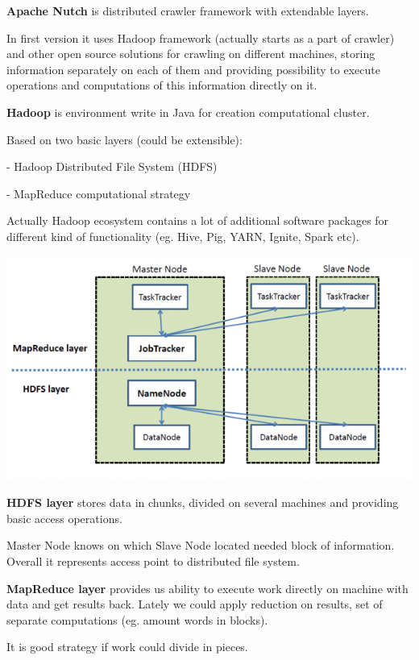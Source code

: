 \documentclass[9pt]{extarticle}
\begin{document}
\begin{multicols}{2}
\textbf{Apache Nutch} is distributed crawler framework with extendable layers.

In first version it uses Hadoop framework (actually starts as a part of crawler)
and other open source solutions for crawling on different machines, storing
information separately on each of them and providing possibility to execute
operations and computations of this information directly on it.\\

\columnbreak

\textbf{Hadoop} is environment write in Java for creation computational cluster.

Based on two basic layers (could be extensible):

- Hadoop Distributed File System (HDFS)

- MapReduce computational strategy

Actually Hadoop ecosystem contains a lot of additional software packages for
different kind of functionality (eg. Hive, Pig, YARN, Ignite, Spark etc).  



\end{multicols}

\begin{center}
\includegraphics[width=0.6\linewidth]{hadoop}
\end{center}

\begin{multicols}{2}

\textbf{HDFS layer}
stores data in chunks, divided on several machines and providing basic access
operations. 

Master Node knows on which Slave Node located needed block of information.
Overall it represents access point to distributed file system. 

\columnbreak

\textbf{MapReduce layer}
provides us ability to execute work directly on machine with data and get
results back. Lately we could apply reduction on results, set of separate
computations (eg. amount words in blocks). 

It is good strategy if work could divide in pieces.
\end{multicols}
\end{document}
